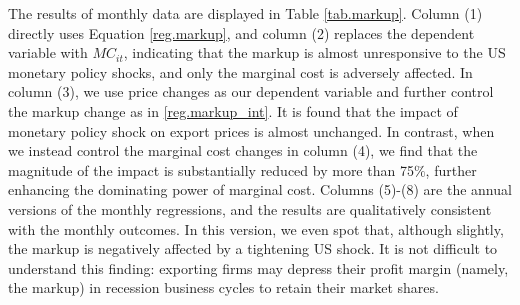 The results of monthly data are displayed in Table \ref{tab.markup}. Column (1) directly uses Equation \ref{reg.markup}, and column (2) replaces the dependent variable with $MC_{it}$, indicating that the markup is almost unresponsive to the US monetary policy shocks, and only the marginal cost is adversely affected. In column (3), we use price changes as our dependent variable and further control the markup change as in \ref{reg.markup_int}. It is found that the impact of monetary policy shock on export prices is almost unchanged. In contrast, when we instead control the marginal cost changes in column (4), we find that the magnitude of the impact is substantially reduced by more than 75$\%$, further enhancing the dominating power of marginal cost. Columns (5)-(8) are the annual versions of the monthly regressions, and the results are qualitatively consistent with the monthly outcomes. In this version, we even spot that, although slightly, the markup is negatively affected by a tightening US shock. It is not difficult to understand this finding: exporting firms may depress their profit margin (namely, the markup) in recession business cycles to retain their market shares. 

